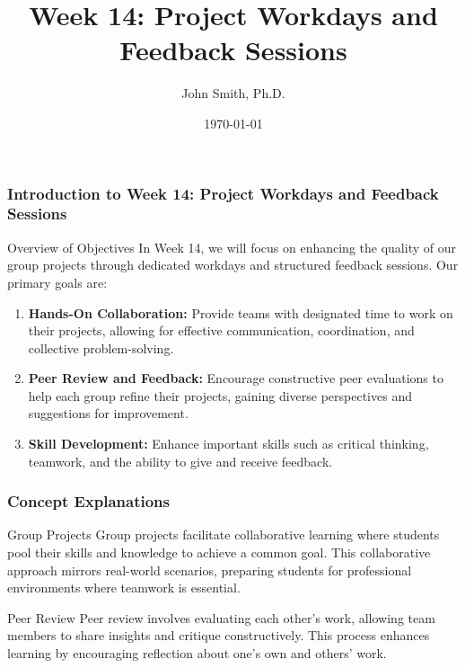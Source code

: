 \documentclass[aspectratio=169]{beamer}
\title[Week 14: Project Workdays]{Week 14: Project Workdays and Feedback Sessions}
\author[J. Smith]{John Smith, Ph.D.}
\institute[University Name]{
  Department of Computer Science\\
  University Name\\
  \vspace{0.3cm}
  Email: email@university.edu\\
  Website: www.university.edu
}
\date{\today}
\begin{document}
\frame{\titlepage}

\begin{frame}[fragile]
    \frametitle{Introduction to Week 14: Project Workdays and Feedback Sessions}
    \begin{block}{Overview of Objectives}
        In Week 14, we will focus on enhancing the quality of our group projects through dedicated workdays and structured feedback sessions. Our primary goals are:
        \begin{enumerate}
            \item \textbf{Hands-On Collaboration:} Provide teams with designated time to work on their projects, allowing for effective communication, coordination, and collective problem-solving.
            \item \textbf{Peer Review and Feedback:} Encourage constructive peer evaluations to help each group refine their projects, gaining diverse perspectives and suggestions for improvement.
            \item \textbf{Skill Development:} Enhance important skills such as critical thinking, teamwork, and the ability to give and receive feedback.
        \end{enumerate}
    \end{block}
\end{frame}

\begin{frame}[fragile]
    \frametitle{Concept Explanations}
    \begin{block}{Group Projects}
        Group projects facilitate collaborative learning where students pool their skills and knowledge to achieve a common goal. This collaborative approach mirrors real-world scenarios, preparing students for professional environments where teamwork is essential.
    \end{block}
    
    \begin{block}{Peer Review}
        Peer review involves evaluating each other's work, allowing team members to share insights and critique constructively. This process enhances learning by encouraging reflection about one's own and others' work.
    \end{block}
\end{frame}
\end{document}
